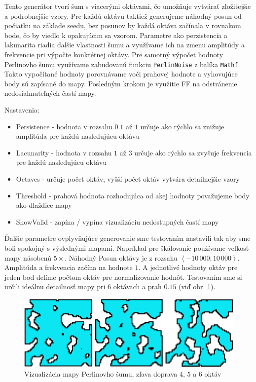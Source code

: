 Tento generátor tvorí šum s viacerými oktávami, čo umožňuje vytvárať zložitejšie a podrobnejšie vzory. Pre každú oktávu taktiež generujeme náhodný posun od počiatku na základe seedu, bez posunov by každá oktáva začínala v rovnakom bode, čo by viedlo k opakujúcim sa vzorom. Parametre ako perzistencia a lakunarita riadia ďalšie vlastnosti šumu a využívame ich na zmenu amplitúdy a frekvencie pri výpočte konkrétnej oktávy. Pre samotný výpočet hodnoty Perlinovho šumu využívame zabudovanú funkciu \verb|PerlinNoise| z balíka \verb|Mathf|. Takto vypočítané hodnoty porovnávame voči prahovej hodnote a vyhovujúce body sú zapísané do mapy. Posledným krokom je využitie FF na odstránenie nedosiahnuteľných častí mapy.

\noindent Nastavenia:

\begin{itemize}
    \item Persistence - hodnota v rozsahu $0.1$ až $1$ určuje ako rýchlo sa znižuje amplitúda pre každú nasledujúcu oktávu
    \item Lacunarity - hodnota v rozsahu $1$ až $3$ určuje ako rýchlo sa zvyšuje frekvencia pre každú nasledujúcu oktávu
    \item Octaves - určuje počet oktáv, vyšší počet oktáv vytvára detailnejšie vzory
    \item Threshold - prahová hodnota rozhodujúca od akej hodnoty považujeme body ako dlaždice mapy
    \item ShowValid - zapína / vypína vizualizáciu nedostupných častí mapy 
\end{itemize}

Ďalšie parametre ovplyvňujúce generovanie sme testovaním nastavili tak aby sme boli spokojný s výslednými mapami. Napríklad pre škálovanie používame veľkosť mapy násobenú $5\times$. Náhodný Posun oktávy je z rozsahu $\left<-10\,000; 10\,000\right>$. Amplitúda a frekvencia začína na hodnote $1$. A jednotlivé hodnoty oktáv pre jeden bod delíme počtom oktáv pre normalizovanie hodnôt. Testovaním sme si určili ideálnu detailnosť mapy pri $6$ oktávach a prah $0.15$ (viď obr. \ref{fig:pn}).

\begin{figure} [H]
    \centering
    \includegraphics[width=0.77\linewidth]{obrazky-figures/pn.png}
    \caption{Vizualizácia mapy Perlinovho šumu, zľava doprava $4$, $5$ a $6$ oktáv}
    \label{fig:pn}
\end{figure}

